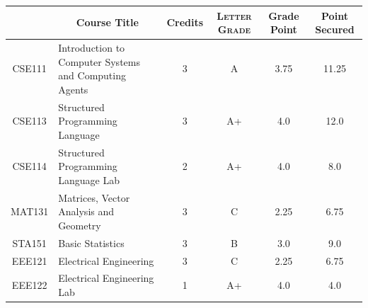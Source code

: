 \documentclass[11pt]{article}
\newcommand*{\numtwo}[1]{\pgfmathprintnumber[
                    fixed, precision=2, fixed zerofill=true]{#1}}
\begin{document}
                \begin{center}
                    \renewcommand{\arraystretch}{1.08}
                    
                \begin{tabular}{|c|l|c|>{\scshape}c|c|c|}
                \hline  \rule[-1ex]{0pt}{3.5ex} {\centering{\bf Course Code}} &  \multicolumn{1}{c|}{\textbf{Course Title}}  & {\bf Credits} & {\bf Letter Grade} & {\bf Grade Point} & {\bf Point Secured}  \\ 
                \hline   CSE111 &  Introduction to Computer Systems and Computing Agents		 & 3 & A & 3.75 & 11.25 \\ %
                \hline   CSE113 &  Structured Programming Language		 & 3 & A+ & 4.0 & 12.0 \\ %
                \hline   CSE114 &  Structured Programming Language Lab		 & 2 & A+ & 4.0 & 8.0 \\ %
                \hline   MAT131 &  Matrices, Vector Analysis and Geometry		 & 3 & C & 2.25 & 6.75 \\ %
                \hline   STA151 &  Basic Statistics		 & 3 & B & 3.0 & 9.0 \\ %
                \hline   EEE121 &  Electrical Engineering		 & 3 & C & 2.25 & 6.75 \\ %
                \hline   EEE122 &  Electrical Engineering Lab		 & 1 & A+ & 4.0 & 4.0 \\ %

\hline                %
                \end{tabular}
                \end{center}
                \renewcommand{\arraystretch}{1.03}
\end{document}
